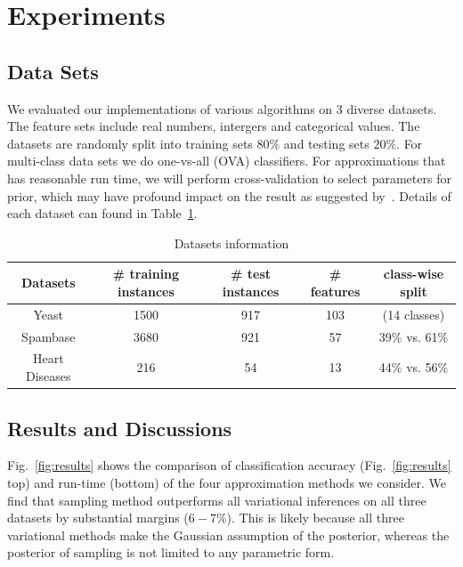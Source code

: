 \section{Experiments}
\label{sec:experiments}

\subsection{Data Sets}

We evaluated our implementations of various algorithms on 3 diverse datasets. The feature sets include real numbers, intergers and categorical values. The datasets are randomly split into training sets $80\%$ and
testing sets $20\%$. For multi-class data sets we do one-vs-all (OVA)
classifiers. For approximations that has reasonable run time, we will perform
cross-validation to select parameters for prior, which may have profound
impact on the result as suggested by~\cite{Asuncion2009smoothing}. Details of each dataset can found in Table~\ref{tb:datasets}.

\begin{table}
\begin{center}
\begin{tabular}{| c | c |  c | c | c |}
  \hline
  Datasets & \# training instances & \# test instances & \# features & class-wise split\\
  \hline
  Yeast & 1500 & 917 & 103 & (14 classes) \\
  \hline
  Spambase & 3680 & 921 & 57 & 39\% vs. 61\% \\
  \hline
  Heart Diseases & 216 & 54 & 13 & 44\% vs. 56\% \\
  \hline
\end{tabular}
\end{center}

\caption{Datasets information}
\label{tb:datasets}
\end{table}

\subsection{Results and Discussions}

Fig.~\ref{fig:results} shows the comparison of classification accuracy
(Fig.~\ref{fig:results} top) and run-time (bottom) of the four approximation
methods we consider. We find that sampling method outperforms all variational
inferences on all three datasets by substantial margins ($6-7\%$). This is
likely because all three variational methods make the Gaussian assumption of
the posterior, whereas the posterior of sampling is not limited to any
parametric form. 

